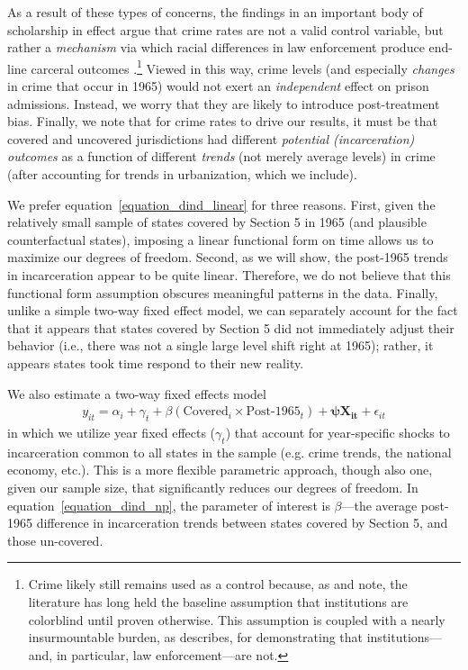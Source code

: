 \documentclass[12pt]{article}
\begin{document}
As a result of these types of concerns, the findings in an important body of scholarship in effect argue that crime rates are not a valid control variable, but rather a \emph{mechanism} via which racial differences in law enforcement produce end-line carceral outcomes \citep{Beckett:2006wf,Lynch:2014wi,VanCleve:2015ux}.\footnote{Crime likely still remains used as a control because, as \cite{Murakawa:2010tc} and \cite{Murakawa:2019wp} note, the literature has long held the baseline assumption that institutions are colorblind until proven otherwise.  This assumption is coupled with a nearly insurmountable burden, as \cite{KohlerHausmann:tw} describes, for demonstrating that institutions---and, in particular, law enforcement---are not.}  Viewed in this way, crime levels (and especially \emph{changes} in crime that occur in 1965) would not exert an \emph{independent} effect on prison admissions.  Instead, we worry that they are likely to introduce post-treatment bias.  Finally, we note that for crime rates to drive our results, it must be that covered and uncovered jurisdictions had different \emph{potential (incarceration) outcomes} as a function of different \emph{trends} (not merely average levels) in crime (after accounting for trends in urbanization, which we include).


We prefer equation~\ref{equation_dind_linear} for three reasons.  First, given the relatively small sample of states covered by Section 5 in 1965 (and plausible counterfactual states), imposing a linear functional form on time allows us to maximize our degrees of freedom.  Second, as we will show, the post-1965 trends in incarceration appear to be quite linear. Therefore, we do not believe that this functional form assumption obscures meaningful patterns in the data.  Finally, unlike a simple two-way fixed effect model, we can separately account for the fact that it appears that states covered by Section 5 did not immediately adjust their behavior (i.e., there was not a single large level shift right at 1965); rather, it appears states took time respond to their new reality.

We also estimate a two-way fixed effects model
\begin{align}
     y_{it} = \alpha_{i} + \gamma_{t} + \beta (\text{Covered}_{i} \times \text{Post-1965}_{t}) + \boldsymbol{\psi X_{it}} + \epsilon_{it}  \label{equation_dind_np}
\end{align}
in which we utilize year fixed effects ($\gamma_{t}$) that account for year-specific shocks to incarceration common to all states in the sample (e.g. crime trends, the national economy, etc.).  This is a more flexible parametric approach, though also one, given our sample size, that significantly reduces our degrees of freedom.  In equation~\ref{equation_dind_np}, the parameter of interest is $\beta$---the average post-1965 difference in incarceration trends between states covered by Section 5, and those un-covered.
\end{document}
